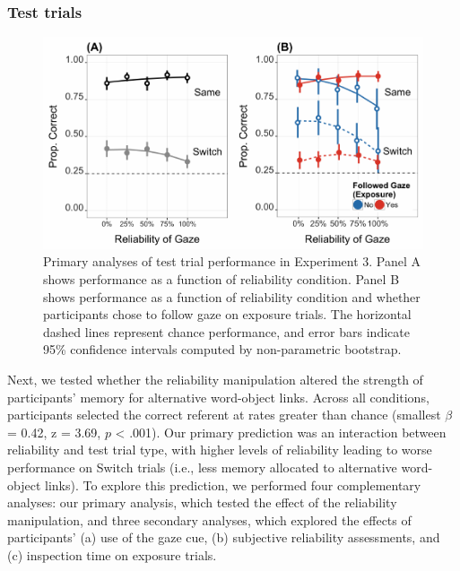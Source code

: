 \documentclass[authoryear, review]{elsarticle}
\newenvironment{CodeChunk}{}{}
\begin{document}
\subsubsection{Test trials}\label{test-trials-2}

\begin{CodeChunk}
\begin{figure}[tb]

{\centering \includegraphics[width=0.9\linewidth]{figs/e3-plot-1} 

}

\caption[Primary analyses of test trial performance in Experiment 3]{Primary analyses of test trial performance in Experiment 3. Panel A shows performance as a function of reliability condition. Panel B shows performance as a function of reliability condition and whether participants chose to follow gaze on exposure trials. The horizontal dashed lines represent chance performance, and error bars indicate 95\% confidence intervals computed by non-parametric bootstrap.}\label{fig:e3-plot}
\end{figure}
\end{CodeChunk}

Next, we tested whether the reliability manipulation altered the
strength of participants' memory for alternative word-object links.
Across all conditions, participants selected the correct referent at
rates greater than chance (smallest \(\beta\) = 0.42, z = 3.69, \(p\)
\textless{} .001). Our primary prediction was an interaction between
reliability and test trial type, with higher levels of reliability
leading to worse performance on Switch trials (i.e., less memory
allocated to alternative word-object links). To explore this prediction,
we performed four complementary analyses: our primary analysis, which
tested the effect of the reliability manipulation, and three secondary
analyses, which explored the effects of participants' (a) use of the
gaze cue, (b) subjective reliability assessments, and (c) inspection
time on exposure trials.
\end{document}
